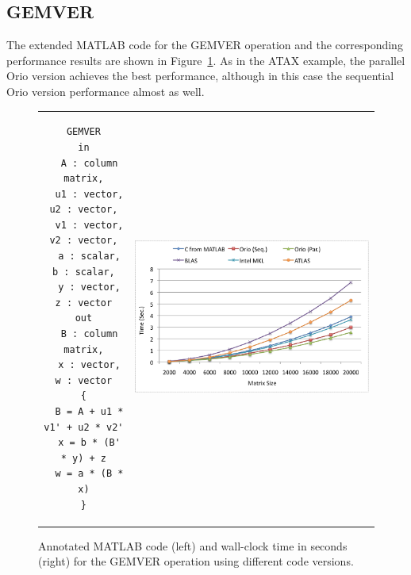 \documentclass[11pt]{article}
\begin{document}
\subsection{GEMVER}


The extended MATLAB code for the GEMVER operation and the corresponding performance results are shown in Figure~\ref{fig:gemver}. As in the ATAX example, the parallel Orio version achieves the best performance, although in this case the sequential Orio version performance almost as well.



\begin{figure}[htp]
\centering
\begin{tabular}{cc}
\begin{minipage}[b]{.3\textwidth}
\footnotesize
\begin{verbatim}
GEMVER
in
  A : column matrix,
  u1 : vector, u2 : vector,
  v1 : vector, v2 : vector,
  a : scalar, b : scalar,
  y : vector, z : vector
out
  B : column matrix,
  x : vector, w : vector
{
  B = A + u1 * v1' + u2 * v2'
  x = b * (B' * y) + z
  w = a * (B * x)
}
\end{verbatim}
\end{minipage}
&
\begin{minipage}[b]{.6\textwidth}
\includegraphics[width=\textwidth]{figures/gemver.png}
\end{minipage}\\
\end{tabular}
\caption{Annotated MATLAB code (left) and wall-clock time in seconds (right) for the GEMVER operation using different code versions.}
\label{fig:gemver}
\end{figure}

%
\end{document}
